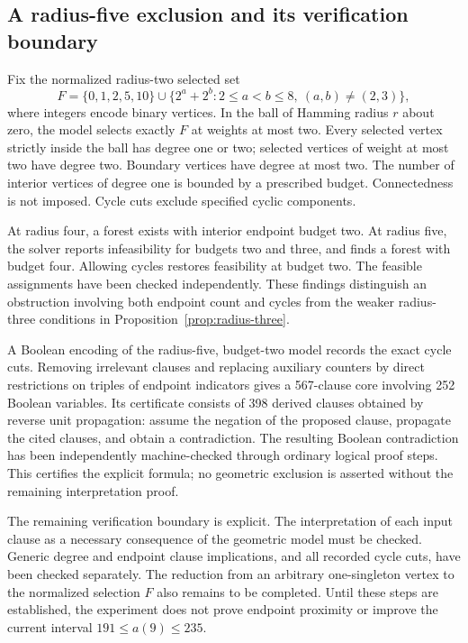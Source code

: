 \documentclass[11pt,a4paper]{article}
\theoremstyle{definition}
\theoremstyle{remark}
\begin{document}
\subsection{A radius-five exclusion and its verification boundary}
Fix the normalized radius-two selected set
\[
F=\{0,1,2,5,10\}\cup
\{2^a+2^b:2\le a<b\le8,\ (a,b)\ne(2,3)\},
\]
where integers encode binary vertices. In the ball of Hamming radius $r$ about zero, the model selects exactly $F$ at weights at most two. Every selected vertex strictly inside the ball has degree one or two; selected vertices of weight at most two have degree two. Boundary vertices have degree at most two. The number of interior vertices of degree one is bounded by a prescribed budget. Connectedness is not imposed. Cycle cuts exclude specified cyclic components.

At radius four, a forest exists with interior endpoint budget two. At radius five, the solver reports infeasibility for budgets two and three, and finds a forest with budget four. Allowing cycles restores feasibility at budget two. The feasible assignments have been checked independently. These findings distinguish an obstruction involving both endpoint count and cycles from the weaker radius-three conditions in Proposition~\ref{prop:radius-three}.

A Boolean encoding of the radius-five, budget-two model records the exact cycle cuts. Removing irrelevant clauses and replacing auxiliary counters by direct restrictions on triples of endpoint indicators gives a 567-clause core involving 252 Boolean variables. Its certificate consists of 398 derived clauses obtained by reverse unit propagation: assume the negation of the proposed clause, propagate the cited clauses, and obtain a contradiction. The resulting Boolean contradiction has been independently machine-checked through ordinary logical proof steps. This certifies the explicit formula; no geometric exclusion is asserted without the remaining interpretation proof.

The remaining verification boundary is explicit. The interpretation of each input clause as a necessary consequence of the geometric model must be checked. Generic degree and endpoint clause implications, and all recorded cycle cuts, have been checked separately. The reduction from an arbitrary one-singleton vertex to the normalized selection $F$ also remains to be completed. Until these steps are established, the experiment does not prove endpoint proximity or improve the current interval $191\le a(9)\le235$.
\end{document}
